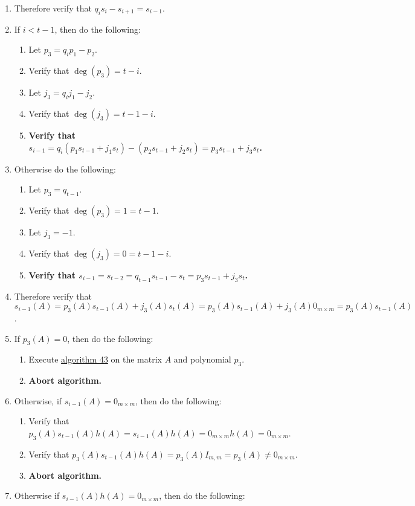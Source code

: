 \documentclass[twocolumn]{article}
\begin{document}
\begin{enumerate}
\begin{enumerate}
					\item Therefore verify that $q_is_i-s_{i+1}=s_{i-1}$.
					\item If $i<t-1$, then do the following:
					\begin{enumerate}
					  \item Let $p_3=q_ip_1-p_2$.
					  \item Verify that $\deg(p_3)=t-i$.
					  \item Let $j_3=q_ij_1-j_2$.
					  \item Verify that $\deg(j_3)=t-1-i$.
						\item \textbf{Verify that $s_{i-1}=q_i(p_1s_{t-1}+j_1s_t)-(p_2s_{t-1}+j_2s_t)=p_3s_{t-1}+j_3s_t$.}
					\end{enumerate}
					\item Otherwise do the following:
					\begin{enumerate}
					  \item Let $p_3=q_{t-1}$.
					  \item Verify that $\deg(p_3)=1=t-1$.
					  \item Let $j_3=-1$.
					  \item Verify that $\deg(j_3)=0=t-1-i$.
						\item \textbf{Verify that $s_{i-1}=s_{t-2}=q_{t-1}s_{t-1}-s_t=p_3s_{t-1}+j_3s_t$.}
					\end{enumerate}
					\item Therefore verify that $s_{i-1}(A)=p_3(A)s_{t-1}(A)+j_3(A)s_t(A)=p_3(A)s_{t-1}(A)+j_3(A)0_{m\times m}=p_3(A)s_{t-1}(A)$.
					\item If $p_3(A)=0$, then do the following:
					\begin{enumerate}
						\item Execute \hyperref[sec:algorithm 43]{algorithm 43} on the matrix $A$ and polynomial $p_3$.
						\item \textbf{Abort algorithm.}
					\end{enumerate}
					\item Otherwise, if $s_{i-1}(A)=0_{m\times m}$, then do the following:
					\begin{enumerate}
						\item Verify that $p_3(A)s_{t-1}(A)h(A)=s_{i-1}(A)h(A)=0_{m\times m}h(A)=0_{m\times m}$.
						\item Verify that $p_3(A)s_{t-1}(A)h(A)=p_3(A)I_{m,m}=p_3(A)\ne0_{m\times m}$.
						\item \textbf{Abort algorithm.}
					\end{enumerate}
					\item Otherwise if $s_{i-1}(A)h(A)=0_{m\times m}$, then do the following:

\end{enumerate}
\end{enumerate}
\end{document}

